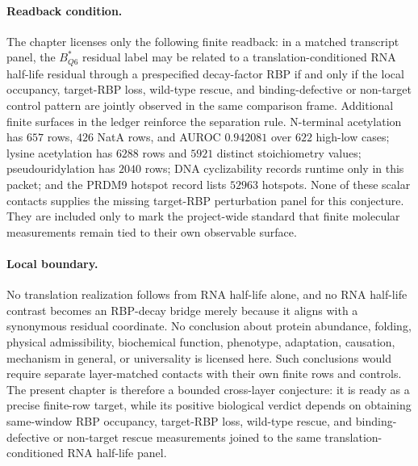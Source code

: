 \paragraph{Readback condition.}
The chapter licenses only the following finite readback: in a matched transcript panel, the $B^{*}_{Q6}$ residual label may be related to a translation-conditioned RNA half-life residual through a prespecified decay-factor RBP if and only if the local occupancy, target-RBP loss, wild-type rescue, and binding-defective or non-target control pattern are jointly observed in the same comparison frame.  Additional finite surfaces in the ledger reinforce the separation rule.  N-terminal acetylation has $657$ rows, $426$ NatA rows, and AUROC $0.942081$ over $622$ high-low cases; lysine acetylation has $6288$ rows and $5921$ distinct stoichiometry values; pseudouridylation has $2040$ rows; DNA cyclizability records runtime only in this packet; and the PRDM9 hotspot record lists $52963$ hotspots.  None of these scalar contacts supplies the missing target-RBP perturbation panel for this conjecture.  They are included only to mark the project-wide standard that finite molecular measurements remain tied to their own observable surface.

\paragraph{Local boundary.}
No translation realization follows from RNA half-life alone, and no RNA half-life contrast becomes an RBP-decay bridge merely because it aligns with a synonymous residual coordinate.  No conclusion about protein abundance, folding, physical admissibility, biochemical function, phenotype, adaptation, causation, mechanism in general, or universality is licensed here.  Such conclusions would require separate layer-matched contacts with their own finite rows and controls.  The present chapter is therefore a bounded cross-layer conjecture: it is ready as a precise finite-row target, while its positive biological verdict depends on obtaining same-window RBP occupancy, target-RBP loss, wild-type rescue, and binding-defective or non-target rescue measurements joined to the same translation-conditioned RNA half-life panel.

